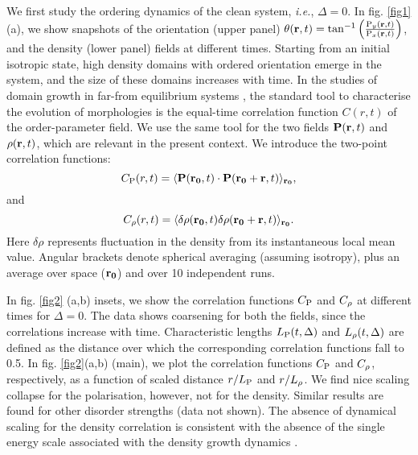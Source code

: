 \documentclass[pre,twocolumn,amssymb,showpacs,superscriptaddress,notitlepage]{revtex4-1}
\begin{document}
We first study the ordering dynamics of  the clean system, {\it i.e.}, $\Delta=0$. 
In fig. \ref{fig1}(a), we show snapshots of the orientation (upper panel) 
$\theta({\bf r},t)=\tan^{-1}\left({\frac{{\rm P}_y({\bf r},t)}{{\rm P}_x({\bf r},t)}}\right)$, and the density (lower panel) fields 
at different times. Starting from an initial isotropic state, high density domains with ordered  orientation 
emerge in the system, and the  size of these domains  increases with time. In the studies of domain growth in far-from equilibrium 
 systems \cite{ajbray1994,puribook}, the standard tool to characterise the evolution of morphologies is the equal-time
correlation function $C(r,t)$ of the order-parameter field. We use the same tool for the two fields ${\bf  P}({\bf r}, t)$ 
and $\rho({\bf r},t)$, which are relevant in the present context. We introduce the two-point correlation functions:
\begin{equation}
C_{\rm  P}(r, t) = \langle   {\bf  P}({\bf r_0}, t) \cdot   {\bf  P}({\bf r_0} +{\bf r}, t) \rangle_{\bf r_0},
\label{opcor}
\end{equation}
and
\begin{equation}
C_{\rm \rho}(r, t) = \langle \delta \rho({\bf r_0}, t) \delta \rho({\bf r_0} +{\bf r}, t) \rangle_{\bf r_0}.
\label{dencor} 
\end{equation}
 Here $\delta \rho $ represents fluctuation in the density from its  instantaneous local  mean value. 
Angular brackets denote spherical averaging (assuming isotropy), plus an average over space (${\bf r_0}$) and over 10 independent runs.

In fig. \ref{fig2} (a,b) insets, we show the correlation functions $C_{\rm  P}$ and $C_{\rm \rho}$ at different times for $\Delta=0$.
The data shows coarsening for both the fields, since the correlations increase with time. Characteristic lengths $L_{\rm  P}(t,\Delta)$ 
and $L_{\rm \rho}(t,\Delta)$ are defined as the distance over which the corresponding correlation functions fall to 0.5. 
In fig. \ref{fig2}(a,b) (main), we plot the correlation functions $C_{\rm  P}$ and $C_{\rm \rho}$, respectively, as a function of 
scaled distance $r/L_{\rm  P}$ and $r/L_{\rm \rho}$. We find nice scaling collapse for the polarisation, 
however, not for the density. Similar results are found for other disorder strengths (data not shown). 
The absence of dynamical scaling for the density correlation is consistent with the absence
of the single energy scale associated with the density growth dynamics \cite{ajbray1994}.
\end{document}
